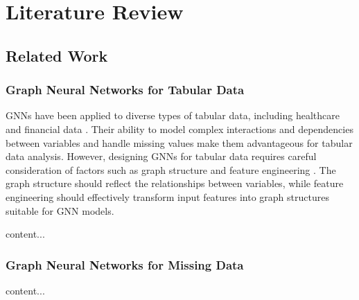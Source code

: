 \chapter{Literature Review} \label{chap:litrev}

\section{Related Work}
%

\subsection{Graph Neural Networks for Tabular Data}
GNNs have been applied to diverse types of tabular data, including healthcare \cite{Mao2019} and financial data  \cite{Seo2018}. Their ability to model complex interactions and dependencies between variables \cite{Zhang2018, Monti2018} and handle missing values \cite{GRAPE} make them advantageous for tabular data analysis. However, designing GNNs for tabular data requires careful consideration of factors such as graph structure and feature engineering \cite{Hu2019}. The graph structure should reflect the relationships between variables, while feature engineering should effectively transform input features into graph structures suitable for GNN models.

content...

\subsection{Graph Neural Networks for Missing Data}
content...

